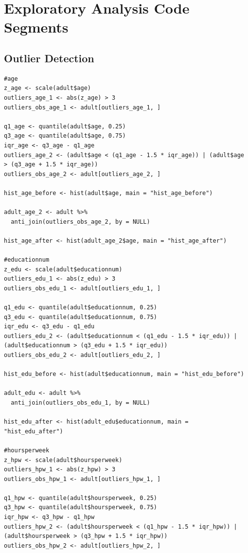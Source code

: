 \documentclass{article}
\begin{document}
\appendix 

\section{Exploratory Analysis Code Segments}

\subsection{Outlier Detection} \label{sec:outlierCode}
\begin{verbatim}
#age
z_age <- scale(adult$age)
outliers_age_1 <- abs(z_age) > 3
outliers_obs_age_1 <- adult[outliers_age_1, ]

q1_age <- quantile(adult$age, 0.25)
q3_age <- quantile(adult$age, 0.75)
iqr_age <- q3_age - q1_age
outliers_age_2 <- (adult$age < (q1_age - 1.5 * iqr_age)) | (adult$age > (q3_age + 1.5 * iqr_age))
outliers_obs_age_2 <- adult[outliers_age_2, ]

hist_age_before <- hist(adult$age, main = "hist_age_before")

adult_age_2 <- adult %>%
  anti_join(outliers_obs_age_2, by = NULL)

hist_age_after <- hist(adult_age_2$age, main = "hist_age_after")

#educationnum
z_edu <- scale(adult$educationnum)
outliers_edu_1 <- abs(z_edu) > 3
outliers_obs_edu_1 <- adult[outliers_edu_1, ]

q1_edu <- quantile(adult$educationnum, 0.25)
q3_edu <- quantile(adult$educationnum, 0.75)
iqr_edu <- q3_edu - q1_edu
outliers_edu_2 <- (adult$educationnum < (q1_edu - 1.5 * iqr_edu)) | (adult$educationnum > (q3_edu + 1.5 * iqr_edu))
outliers_obs_edu_2 <- adult[outliers_edu_2, ]

hist_edu_before <- hist(adult$educationnum, main = "hist_edu_before") 

adult_edu <- adult %>%
  anti_join(outliers_obs_edu_1, by = NULL)

hist_edu_after <- hist(adult_edu$educationnum, main = "hist_edu_after") 

#hoursperweek
z_hpw <- scale(adult$hoursperweek)
outliers_hpw_1 <- abs(z_hpw) > 3
outliers_obs_hpw_1 <- adult[outliers_hpw_1, ]

q1_hpw <- quantile(adult$hoursperweek, 0.25)
q3_hpw <- quantile(adult$hoursperweek, 0.75)
iqr_hpw <- q3_hpw - q1_hpw
outliers_hpw_2 <- (adult$hoursperweek < (q1_hpw - 1.5 * iqr_hpw)) | (adult$hoursperweek > (q3_hpw + 1.5 * iqr_hpw))
outliers_obs_hpw_2 <- adult[outliers_hpw_2, ]


\end{verbatim}
\end{document}

